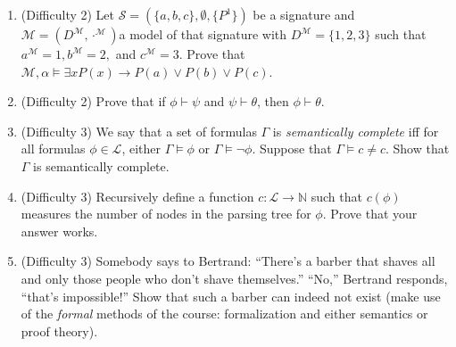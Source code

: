 \begin{enumerate}[\thesubsection.1]
\item (Difficulty 2) Let $\mathcal{S}=(\{a,b,c\},
  \emptyset,\{P^1\})$ be a signature and
    $\mathcal{M}=(D^\mathcal{M},\cdot^\mathcal{M})$a model of that
    signature with $D^\mathcal{M}=\{1,2,3\}$ such that $a^\mathcal{M}=1,
    b^\mathcal{M}=2,$ and $c^\mathcal{M}=3$. Prove that
    $\mathcal{M},\alpha\vDash \exists xP(x)\to P(a)\lor
    P(b)\lor P(c)$.

  \item (Difficulty 2) Prove that if $\phi\vdash\psi$ and $\psi\vdash\theta$, then
    $\phi\vdash\theta$.

 \item (Difficulty 3) We say that a set of formulas $\Gamma$ is \emph{semantically
      complete} iff for all formulas $\phi\in\mathcal{L}$, either
    $\Gamma\vDash\phi$ or $\Gamma\vDash\neg\phi$. Suppose that
    $\Gamma\vDash c\neq c$. Show that $\Gamma$ is semantically
    complete.

    \item (Difficulty 3) Recursively define a function
      $c:\mathcal{L}\to\mathbb{N}$ such that $c(\phi)$ measures the
      number of nodes in the parsing tree for $\phi$. Prove that your
      answer works.

\item (Difficulty 3) Somebody says to Bertrand: ``There's a barber that shaves all
  and only those people who don't shave themselves.'' ``No,''
  Bertrand responds, ``that's impossible!'' Show that such a barber
  can indeed not exist (make use of the \emph{formal} methods of the
  course: formalization and either semantics or proof theory).
	
	\end{enumerate}

